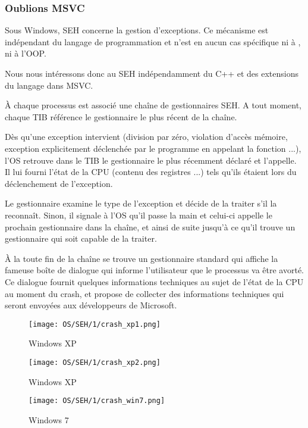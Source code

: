 ﻿\subsubsection{Oublions MSVC}

Sous Windows, \ac{SEH} concerne la gestion d'exceptions. Ce mécanisme est indépendant du langage
de programmation et n'est en aucun cas spécifique ni à \Cpp, ni à l'\ac{OOP}.

Nous nous intéressons donc au \ac{SEH} indépendamment du C++ et des extensions du langage dans MSVC.


À chaque processus est associé une chaîne de gestionnaires \ac{SEH}. A tout moment, chaque \ac{TIB}
référence le gestionnaire le plus récent de la chaîne.

Dès qu'une exception intervient (division par zéro, violation d'accès mémoire, exception explicitement
déclenchée par le programme en appelant la fonction  ...), l'OS retrouve dans le
\ac{TIB} le gestionnaire le plus récemment déclaré et l'appelle. Il lui fourni l'état de la \ac{CPU}
(contenu des registres ...) tels qu'ils étaient lors du déclenchement de l'exception.

Le gestionnaire examine le type de l'exception et décide de la traiter s'il la reconnaît. Sinon, il
signale à l'\ac{OS} qu'il passe la main et celui-ci appelle le prochain gestionnaire dans la chaîne,
et ainsi de suite jusqu'à ce qu'il trouve un gestionnaire qui soit capable de la traiter.

À la toute fin de la chaîne se trouve un gestionnaire standard qui affiche la fameuse boîte de
dialogue qui informe l'utilisateur que le processus va être avorté. Ce dialogue fournit quelques
informations techniques au sujet de l'état de la \ac{CPU} au moment du crash, et propose de collecter
des informations techniques qui seront envoyées aux développeurs de Microsoft.

\begin{figure}[H]
\centering
\texttt{[image: OS/SEH/1/crash\_xp1.png]}
\caption{Windows XP}
\end{figure}

\begin{figure}[H]
\centering
\texttt{[image: OS/SEH/1/crash\_xp2.png]}
\caption{Windows XP}
\end{figure}

\begin{figure}[H]
\centering
\texttt{[image: OS/SEH/1/crash\_win7.png]}
\caption{Windows 7}
\end{figure}


